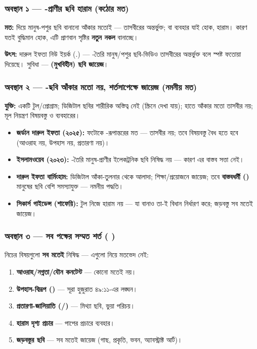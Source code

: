 \subsubsection*{অবস্থান ১ — -প্রাণীর ছবি হারাম (কঠোর মত)}

\textbf{মত:}  দিয়ে মানুষ-পশুর ছবি বানানো আঁকার মতোই — তাসবীরের অন্তর্ভুক্ত;  বা ব্যবহার যাই হোক, হারাম। কারণ  যতই বুদ্ধিমান হোক, এটি প্রাণবান সৃষ্টির \textbf{নতুন নকল} বানাচ্ছে।

\textbf{উৎস:} দারুল ইফতা নিউ ইয়র্ক (.) — -তৈরি মানুষ/পশুর ছবি-ভিডিও তাসবীরের অন্তর্ভুক্ত বলে স্পষ্ট ফতোয়া দিয়েছে। সুবিধা — \textbf{ (মুখবিহীন) ছবি জায়েজ}।

\subsubsection*{অবস্থান ২ — -ছবি আঁকার মতো নয়, শর্তসাপেক্ষে জায়েজ (নমনীয় মত)}

\textbf{যুক্তি:}  একটি টুল/প্রোগ্রাম; ডিজিটাল ছবির শারীরিক অস্তিত্ব নেই (স্ক্রিনে দেখা যায়); হাতে আঁকার মতো তাসবীর নয়; মূল নিয়ন্ত্রণ বিষয়বস্তু ও ব্যবহারের।

\begin{itemize}
\item \textbf{জর্ডান দারুল ইফতা (২০২৫):} ফটোকে -রূপান্তরের মত — তাসবীর নয়; তবে বিষয়বস্তু বৈধ হতে হবে (আওরাহ নয়, উপহাস নয়, প্রতারণা নয়)।
\item \textbf{ইসলামওয়েব (২০২৩):} -তৈরি মানুষ-প্রাণীর ইলেকট্রনিক ছবি নিষিদ্ধ নয় — কারণ এর বাস্তব সত্তা নেই।
\item \textbf{দারুল ইফতা বার্মিংহাম:}  ডিজিটাল আঁকা-তুলনার থেকে আলাদা; শিক্ষা/প্রয়োজনে জায়েজ; তবে \textbf{বাস্তবধর্মী ()} মানুষের ছবি বেশি সমস্যাযুক্ত — নমনীয় পদ্ধতি।
\item \textbf{সিকার্স গাইডেন্স (শাফেয়ি):} টুল নিজে হারাম নয় — যা বানাও তা-ই বিধান নির্ধারণ করে; জড়বস্তু সব মতেই জায়েজ।
\end{itemize}
\subsubsection*{অবস্থান ৩ — সব পক্ষের সম্মত শর্ত ( )}

নিচের বিষয়গুলো \textbf{সব মতেই} নিষিদ্ধ — এগুলো নিয়ে মতভেদ নেই:

\begin{enumerate}
\item \textbf{আওরাহ/নগ্নতা/যৌন কনটেন্ট} — কোনো মতেই নয়।
\item \textbf{উপহাস-বিদ্রূপ ()} — সূরা হুজুরাত ৪৯:১১-এর লঙ্ঘন।
\item \textbf{প্রতারণা-জালিয়াতি (/)} — মিথ্যা ছবি, ভুয়া পরিচয়।
\item \textbf{হারাম দৃশ্য প্রচার} — পাপের প্রচারে  ব্যবহার।
\item \textbf{জড়বস্তুর  ছবি} — সব মতেই জায়েজ (গাছ, প্রকৃতি, ভবন, অ্যাবস্ট্রাক্ট আর্ট)।
\end{enumerate}
